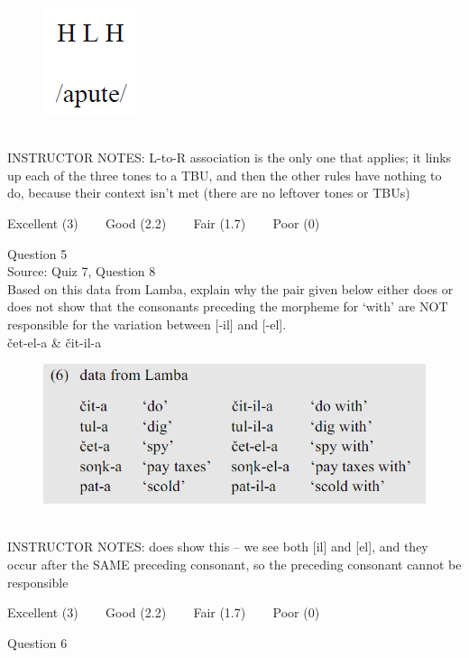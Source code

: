 \documentclass[12pt]{article}
\begin{document}
\begin{figure}[H]
\includegraphics{../images/mendetone_a.png}
\end{figure}

~\\
INSTRUCTOR NOTES: L-to-R association is the only one that applies; it links up each of the three tones to a TBU, and then the other rules have nothing to do, because their context isn't met (there are no leftover tones or TBUs)


\vfill
Excellent (3) ~~~ Good (2.2) ~~~ Fair (1.7) ~~~ Poor (0)
\newpage

{\large Question 5}\\

Source: Quiz 7, Question 8\\

Based on this data from Lamba, explain why the pair given below either does or does not show that the consonants preceding the morpheme for `with' are NOT responsible for the variation between [-il] and [-el].\\

čet-el-a \& čit-il-a

\begin{figure}[H]
\includegraphics{../images/peng119_lamba.png}
\end{figure}

~\\
INSTRUCTOR NOTES: does show this -- we see both [il] and [el], and they occur after the SAME preceding consonant, so the preceding consonant cannot be responsible


\vfill
Excellent (3) ~~~ Good (2.2) ~~~ Fair (1.7) ~~~ Poor (0)
\newpage

{\large Question 6}\\
\end{document}
